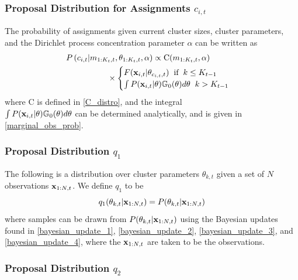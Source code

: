 \documentclass{article}
\begin{document}
\subsubsection{Proposal Distribution for Assignments $c_{i,t}$}
\label{sec:smc_proposal_1}

The probability of assignments given current cluster sizes, cluster parameters, and the Dirichlet process concentration parameter $\alpha$ can be written as
\begin{align}
\begin{split}
\label{smc_assig_eqn}
P &\left( c_{i,t} | m_{1:K_{t}, t}, \theta_{1:K_{t}, t}, \alpha \right) \propto
\text{C}(m_{1:K_{t}, t}, \alpha) \\ 
& \hspace{15mm}\times
\begin{cases}
F(\bold{x}_{i,t} | \theta_{c_{i,t},t}) \hspace{2mm} \text{if} \hspace{2mm} k \leq K_{t-1} \\
\int P(\bold{x}_{i,t} | \theta) \mathbb{G}_{0}(\theta)d\theta \hspace{2mm} k > K_{t-1}
\end{cases}
\end{split}
\end{align}
where C is defined in \eqref{C_distro}, and the integral \\
$\int P(\bold{x}_{i,t} | \theta) \mathbb{G}_{0}(\theta)d\theta$ can be determined analytically, and is given in \eqref{marginal_obs_prob}.


\subsubsection{Proposal Distribution $q_{1}$}
\label{sec:smc_proposal_2}

The following is a distribution over cluster parameters $\theta_{k,t}$ given a set of $N$ observations $\bold{x}_{1:N, t}$. We define $q_{1}$ to be
\begin{equation}
\label{smc_q1_eqn}
q_{1}(\theta_{k,t} | \bold{x}_{1:N,t}) = P(\theta_{k,t} | \bold{x}_{1:N,t})
\end{equation}
where samples can be drawn from $P(\theta_{k,t} | \bold{x}_{1:N,t})$ using the Bayesian updates found in \eqref{bayesian_update_1}, \eqref{bayesian_update_2}, \eqref{bayesian_update_3}, and \eqref{bayesian_update_4}, where the $\bold{x}_{1:N,t}$ are taken to be the observations.


\subsubsection{Proposal Distribution $q_{2}$}
\label{sec:smc_proposal_3}
\end{document}

